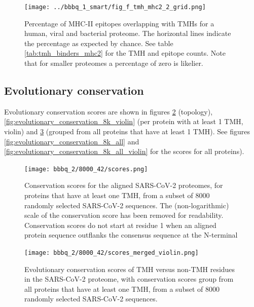 \begin{figure}[!htbp]
  \texttt{[image: ../bbbq\_1\_smart/fig\_f\_tmh\_mhc2\_2\_grid.png]}
  \caption{
    Percentage of MHC-II epitopes overlapping with TMHs
    for a human, viral and bacterial proteome.
    The horizontal lines indicate the percentage as expected by chance.
    See table \ref{tab:tmh_binders_mhc2} for the TMH and epitope counts.
    Note that for smaller proteomes a percentage of zero is likelier.
  }
  \label{fig:2}
\end{figure}

\subsection{Evolutionary conservation}

Evolutionary conservation scores are shown in 
figures \ref{fig:evolutionary_conservation_8k} (topology),
\ref{fig:evolutionary_conservation_8k_violin} (per 
protein with at least 1 TMH, violin)
and \ref{fig:evolutionary_conservation_8k_merged} (grouped 
from all proteins that have at least 1 TMH).
See figures
\ref{fig:evolutionary_conservation_8k_all} and 
\ref{fig:evolutionary_conservation_8k_all_violin}
for the scores for all proteins).


\begin{figure}[!htbp]
  \texttt{[image: bbbq\_2/8000\_42/scores.png]}
  \caption{
    Conservation scores for the aligned SARS-CoV-2 proteomes,
    for proteins that have at least one TMH,
    from a subset of 8000 randomly selected SARS-CoV-2 sequences.
    The (non-logarithmic) scale of the conservation score has been removed
    for readability.
    Conservation scores do not start at residue 1 when
    an aligned protein sequence outflanks the consensus sequence 
    at the N-terminal
  }
  \label{fig:evolutionary_conservation_8k}
\end{figure}

\begin{figure}[!htbp]
  \texttt{[image: bbbq\_2/8000\_42/scores\_merged\_violin.png]}
  \caption{
    Evolutionary conservation scores of TMH versus non-TMH
    residues in the SARS-CoV-2 proteome,
    with conservation scores group from all proteins that have at least one TMH,
    from a subset of 8000 randomly selected SARS-CoV-2 sequences.
  }
  \label{fig:evolutionary_conservation_8k_merged}
\end{figure}

